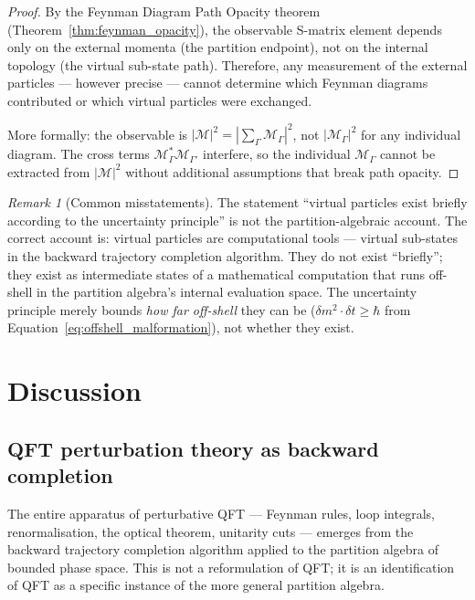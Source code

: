 \documentclass[twocolumn,10pt,a4paper]{article}
\theoremstyle{thmstyle}
\theoremstyle{definition}
\theoremstyle{remark}
\newtheorem{remark}[theorem]{Remark}
\begin{document}
\begin{proof}
By the Feynman Diagram Path Opacity theorem (Theorem~\ref{thm:feynman_opacity}),
the observable S-matrix element depends only on the external momenta
(the partition endpoint), not on the internal topology (the virtual
sub-state path). Therefore, any measurement of the external particles
--- however precise --- cannot determine which Feynman diagrams contributed
or which virtual particles were exchanged.

More formally: the observable is $|\mathcal{M}|^2 = |\sum_\Gamma\mathcal{M}_\Gamma|^2$,
not $|\mathcal{M}_\Gamma|^2$ for any individual diagram.
The cross terms $\mathcal{M}_\Gamma^*\mathcal{M}_{\Gamma'}$ interfere,
so the individual $\mathcal{M}_\Gamma$ cannot be extracted from $|\mathcal{M}|^2$
without additional assumptions that break path opacity.
\end{proof}

\begin{remark}[Common misstatements]
The statement ``virtual particles exist briefly according to the
uncertainty principle'' is not the partition-algebraic account.
The correct account is: virtual particles are computational tools ---
virtual sub-states in the backward trajectory completion algorithm.
They do not exist ``briefly''; they exist as intermediate states of a
mathematical computation that runs off-shell in the partition algebra's
internal evaluation space. The uncertainty principle merely bounds
\emph{how far off-shell} they can be ($\delta m^2 \cdot \delta t \geq \hbar$
from Equation~\eqref{eq:offshell_malformation}), not whether they exist.
\end{remark}

\section{Discussion}
\label{sec:disc}

\subsection{QFT perturbation theory as backward completion}

The entire apparatus of perturbative QFT --- Feynman rules, loop integrals,
renormalisation, the optical theorem, unitarity cuts --- emerges from
the backward trajectory completion algorithm applied to the partition algebra
of bounded phase space. This is not a reformulation of QFT; it is an
identification of QFT as a specific instance of the more general partition
algebra.
\end{document}
